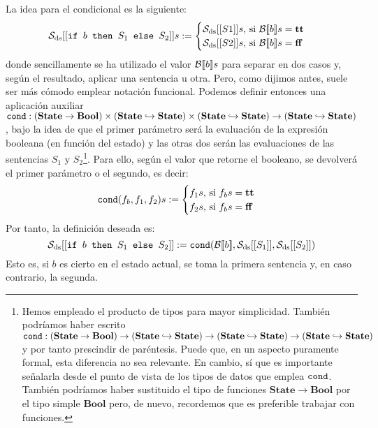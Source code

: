La idea para el condicional es la siguiente:
\[
    \mathcal{S}_{\mathrm{ds}} [[\texttt{if } b\texttt{ then } S_1\texttt{ else } S_2]]s := 
    \begin{cases}  
        \mathcal{S}_{\mathrm{ds}} [[S1]]s\text{, si } \mathcal{B}[\![b]\!]s = \textbf{tt} \\
        \mathcal{S}_{\mathrm{ds}} [[S2]]s\text{, si } \mathcal{B}[\![b]\!]s = \textbf{ff}
   \end{cases}
\]
donde sencillamente se ha utilizado el valor $\mathcal{B}[\![b]\!]s$ para separar en dos casos y, según el resultado, aplicar una sentencia u otra. Pero, como dijimos antes, suele ser más cómodo emplear notación funcional. Podemos definir entonces una aplicación auxiliar $\texttt{cond} : (\textbf{State} \to \mathbf{Bool}) \times (\textbf{State} \hookrightarrow  \textbf{State}) \times (\textbf{State} \hookrightarrow  \textbf{State}) \to (\textbf{State} \hookrightarrow  \textbf{State})$, bajo la idea de que el primer parámetro será la evaluación de la expresión booleana (en función del estado) y las otras dos serán las evaluaciones de las sentencias $S_1$ y $S_2$\footnote{Hemos empleado el producto de tipos para mayor simplicidad. También podríamos haber escrito $\texttt{cond} : (\textbf{State} \to \mathbf{Bool}) \to (\textbf{State} \hookrightarrow  \textbf{State}) \to (\textbf{State} \hookrightarrow  \textbf{State}) \to (\textbf{State} \hookrightarrow  \textbf{State})$ y por tanto prescindir de paréntesis. Puede que, en un aspecto puramente formal, esta diferencia no sea relevante. En cambio, sí que es importante señalarla desde el punto de vista de los tipos de datos que emplea $\texttt{cond}$. También podríamos haber sustituido el tipo de funciones $\mathbf{State}\to \mathbf{Bool}$ por el tipo simple $\mathbf{Bool}$ pero, de nuevo, recordemos que es preferible trabajar con funciones.}. Para ello, según el valor que retorne el booleano, se devolverá el primer parámetro o el segundo, es decir:
\[
    \texttt{cond}(f_b, f_1, f_2) s := 
    \begin{cases}
        
        f_1s\text{, si } f_bs = \textbf{tt}  \\
        f_2 s\text{, si } f_bs = \textbf{ff} 
    \end{cases}
\]
Por tanto, la definición deseada es:
\[
    \mathcal{S}_{\mathrm{ds}} [[\texttt{if } b\texttt{ then } S_1\texttt{ else } S_2]] := \texttt{cond}(\mathcal{B}[\![b]\!], \mathcal{S}_{\mathrm{ds}} [[S_1]], \mathcal{S}_{\mathrm{ds}} [[S_2]])
\]
Esto es, si $b$ es cierto en el estado actual, se toma la primera sentencia y, en caso contrario, la segunda. 
\\

